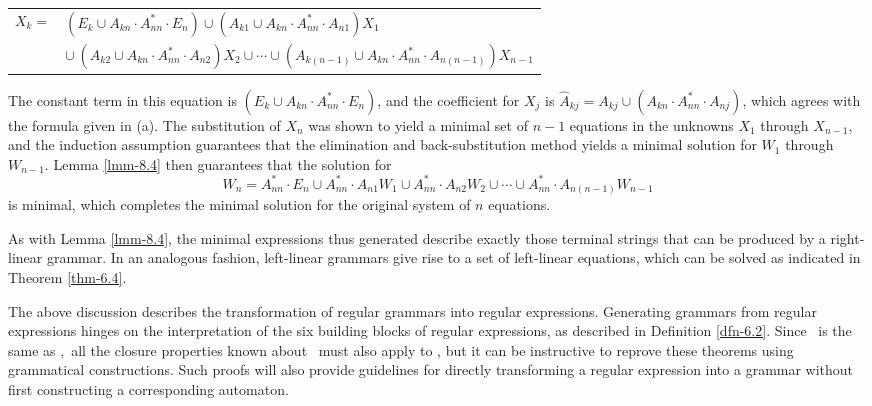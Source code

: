 \begin{lmm}
\begin{center}
\begin{tabular}{r@{ }l}
$X_k =$ & $(E_k\cup A_{kn}\cdot A^*_{nn}\cdot E_n)\cup(A_{k1}\cup A_{kn}\cdot
	A^*_{nn}\cdot A_{n1})X_1$ \\
& $\cup\ (A_{k2}\cup A_{kn}\cdot A^*_{nn}\cdot A_{n2})X_2\cup\cdots\cup(A_{k(n-1
	)}\cup A_{kn}\cdot A^*_{nn}\cdot A_{n(n-1)})X_{n-1}$
\end{tabular}\end{center}
The constant term in this equation is $(E_k\cup A_{kn}\cdot A^*_{nn}\cdot E_n)$,
and the coefficient for $X_j$ is $\hat{A}_{kj} = A_{kj}\cup(A_{kn}\cdot A^*_{nn}
\cdot A_{nj})$, which agrees with the formula given in (a). The substitution of
$X_n$ was shown to yield a minimal set of $n-1$ equations in the unknowns $X_1$
through $X_{n-1}$, and the induction assumption guarantees that the elimination
and back-substitution method yields a minimal solution for $W_1$ through
$W_{n-1}$. Lemma \ref{lmm-8.4} then guarantees that the solution for
\[ W_n = A^*_{nn}\cdot E_n\cup A^*_{nn}\cdot A_{n1}W_1\cup A^*_{nn}\cdot A_{n2}
	W_2\cup\cdots\cup A^*_{nn}\cdot A_{n(n-1)}W_{n-1} \]
is minimal, which completes the minimal solution for the original system of $n$
equations.
\end{lmm}

As with Lemma \ref{lmm-8.4}, the minimal expressions thus generated describe exactly
those terminal strings that can be produced by a right-linear grammar. In an
analogous fashion, left-linear grammars give rise to a set of left-linear
equations, which can be solved as indicated in Theorem \ref{thm-6.4}.

The above discussion describes the transformation of regular grammars into
regular expressions. Generating grammars from regular expressions hinges on
the interpretation of the six building blocks of regular expressions, as
described in Definition \ref{dfn-6.2}. Since \GSIG\ is the same as \DSIG,\ all the closure
properties known about \DSIG\ must also apply to \GSIG, but it can be
instructive to reprove these theorems using grammatical constructions. Such
proofs will also provide guidelines for directly transforming a regular
expression into a grammar without first constructing a corresponding automaton.

